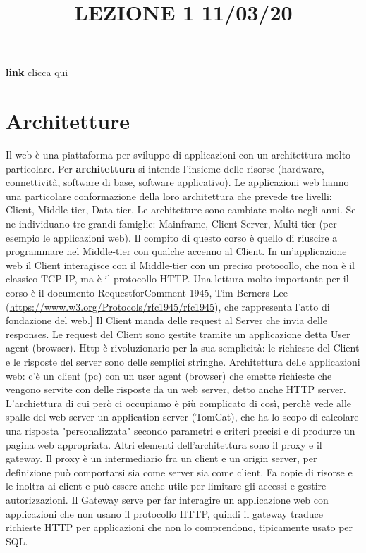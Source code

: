 \title{LEZIONE 1 11/03/20}\newline
\textbf{link} \href{https://web.microsoftstream.com/video/58568b1d-5fc5-41c0-88f6-608e4b8f9f7a}{clicca qui}
\section{Architetture}
Il web è una piattaforma per sviluppo di applicazioni con un architettura molto particolare. Per \textbf{architettura} si intende l'insieme delle risorse (hardware, connettività, software di base, software applicativo).\newline
\newline
Le applicazioni web hanno una particolare conformazione della loro architettura che prevede tre livelli: Client, Middle-tier, Data-tier.\newline 
Le architetture sono  cambiate molto negli anni. Se ne individuano tre grandi famiglie: Mainframe, Client-Server, Multi-tier (per esempio le applicazioni web). \newline
Il compito di questo corso è quello di riuscire a programmare nel Middle-tier con qualche accenno al Client.
In un'applicazione web il Client interagisce con il Middle-tier con un preciso protocollo, che non è il classico TCP-IP, ma è il protocollo HTTP.\newline
\newline
Una lettura molto importante per il corso è il documento RequestforComment 1945, Tim Berners Lee (\url{https://www.w3.org/Protocols/rfc1945/rfc1945}), che rappresenta l'atto di fondazione del web.]\newline
\newline
Il Client manda delle request al Server che invia delle responses. Le request del Client sono gestite tramite un applicazione detta User agent (browser).\newline
Http è rivoluzionario per la sua semplicità: le richieste del Client e le risposte del server sono delle semplici stringhe. \newline
Architettura delle applicazioni web: c'è un client (pc) con un user agent (browser) che emette richieste che vengono servite con delle risposte da un web server, detto anche HTTP server. L'archiettura di cui però ci occupiamo è più complicato di così, perchè vede alle spalle del web server un application server (TomCat), che ha lo scopo di calcolare una risposta "personalizzata" secondo parametri e criteri precisi e di produrre un pagina web appropriata.\newline
Altri elementi dell'architettura sono il proxy e il gateway. Il proxy è un intermediario fra un client e un origin server, per definizione può comportarsi sia come server sia come client. Fa copie di risorse e le inoltra ai client e può essere anche utile per limitare gli accessi e gestire autorizzazioni. Il Gateway serve per far interagire un applicazione web con applicazioni che non usano il protocollo HTTP, quindi il gateway traduce richieste HTTP per applicazioni che non lo comprendono, tipicamente usato per SQL.
